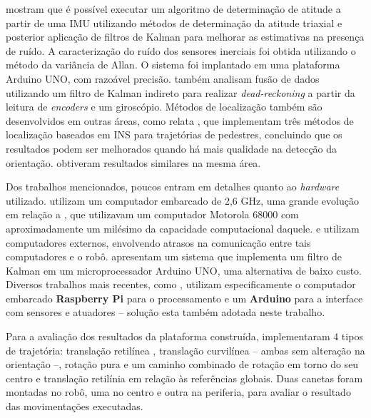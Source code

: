 \cite{lowcostIMU} mostram que é possível executar um algoritmo de determinação de atitude a partir de uma IMU utilizando métodos de determinação da atitude triaxial e posterior aplicação de filtros de Kalman para melhorar as estimativas na presença de ruído. A caracterização do ruído dos sensores inerciais foi obtida utilizando o método da variância de Allan. O sistema foi implantado em uma plataforma Arduino UNO, com razoável precisão. \cite{park1996dead} também analisam fusão de dados utilizando um filtro de Kalman indireto para realizar \emph{dead-reckoning} a partir da leitura de \emph{encoders} e um giroscópio. Métodos de localização também são desenvolvidos em outras áreas, como relata \cite{jimenez2009comparison}, que implementam três métodos de localização baseados em INS para trajetórias de pedestres, concluindo que os resultados podem ser melhorados quando há mais qualidade na detecção da orientação. \cite{steinhoff2010pocket} obtiveram resultados similares na mesma área.

Dos trabalhos mencionados, poucos entram em detalhes quanto ao \emph{hardware} utilizado. \cite{oubbati2005velocity} utilizam um computador embarcado de 2,6 GHz, uma grande evolução em relação a \cite{feng1989servo}, que utilizavam um computador Motorola 68000 com aproximadamente um milésimo da capacidade computacional daquele. \cite{takemura2007development} e \cite{loh2003mechatronics} utilizam computadores externos, envolvendo atrasos na comunicação entre tais computadores e o robô. \cite{lowcostIMU} apresentam um sistema que implementa um filtro de Kalman em um microprocessador Arduino UNO, uma alternativa de baixo custo. Diversos trabalhos mais recentes, como \cite{krinkin2015design}, utilizam especificamente o computador embarcado \textbf{Raspberry Pi} para o processamento e um \textbf{Arduino} para a interface com sensores e atuadores -- solução esta também adotada neste trabalho.

Para a avaliação dos resultados da plataforma construída, \cite{loh2003mechatronics} implementaram 4 tipos de trajetória: translação retilínea , translação curvilínea -- ambas sem alteração na orientação --, rotação pura e um caminho combinado de rotação em torno do seu centro e translação retilínia em relação às referências globais. Duas canetas foram montadas no robô, uma no centro e outra na periferia, para avaliar o resultado das movimentações executadas.
